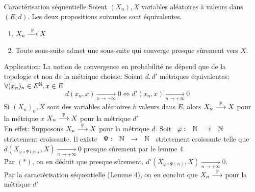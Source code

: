 \documentclass[]{report}
\begin{document}
    \begin{lm}{Caractérisation séquentielle}{}
        Soient $(X_n),X$ variables aléatoires à valeurs dans $(E,d)$. Les deux propositions suivantes sont équivalentes.
        \begin{enumerate}
            \item $X_n\overset{\mathbb{P}}{\longrightarrow}X$
            \item Toute sous-suite admet une sous-suite qui converge presque sûrement vers $X$.
        \end{enumerate}
        Application: La notion de convergence en probabilité ne dépend que de la topologie et non de la métrique choisie: Soient $d,d'$ métriques équivalentes: $\forall (x_n)_n\in E^{\mathbb{N}},x\in E$
        \[d(x_n,x)\underset{n\to +\infty}{\longrightarrow}0\iff d'(x_n,x)\underset{n\to +\infty}{\longrightarrow} 0\]
        Si $(X_n)_n,X$ sont des variables aléatoires à valeurs dans $E$, alors $X_n\overset{\mathbb{P}}{\longrightarrow}X$ pour la métrique $x$ \ssi $X_n\overset{\mathbb{P}}{\longrightarrow}X$ pour la métrique $d'$\\
        En effet: Supposons $X_n\overset{\mathbb{P}}{\longrightarrow}X$ pour la métrique $d$. Soit $\begin{array}{ccccc} \varphi : & \mathbb{N} & \to & \mathbb{N} \end{array}$ strictement croissante. Il existe $\begin{array}{ccccc} \Psi : & \mathbb{N} & \to & \mathbb{N} \end{array}$ strictement croissante telle que $d(X_{\varphi\circ\Psi(n)},X)\underset{n\to +\infty}{\longrightarrow}0$ presque sûrement par le lemme 4.\\
        Par $(*)$, on en déduit que presque sûrement, $d'(X_{\varphi\circ\Psi(n)},X)\underset{n\to+\infty}{\longrightarrow}0$.\\
        Par la caractérisation séquentielle (Lemme 4), on en conclut que $X_n\overset{\mathbb{P}}{\longrightarrow}$ pour la métrique $d'$
    \end{lm}
\end{document}
